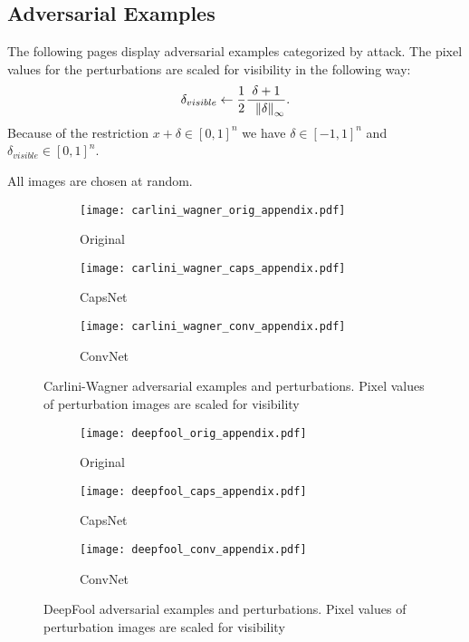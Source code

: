 \subsection{Adversarial Examples}
\label{lab:images}

The following pages display adversarial examples categorized by attack.
The pixel values for the perturbations are scaled for visibility in the following way:
\begin{equation*}
\delta_{visible} \gets \frac{1}{2}\frac{\delta + 1}{\hspace{0.6em} \norm[\infty]{\delta}} .
\end{equation*}
Because of the restriction $x + \delta \in [0,1]^n$ we have $\delta \in [-1,1]^n$ and $\delta_{visible} \in [0,1]^n$.

All images are chosen at random.

\begin{figure}
	\centering
	
	\begin{subfigure}{.23\textwidth}
		\centering
		\texttt{[image: carlini\_wagner\_orig\_appendix.pdf]}%
		\caption{Original}%
	\end{subfigure}%
	\begin{subfigure}{.36\textwidth}
		\centering
		\texttt{[image: carlini\_wagner\_caps\_appendix.pdf]}%
		\caption{CapsNet}
	\end{subfigure}%
	\begin{subfigure}{.36\textwidth}
		\centering
		\texttt{[image: carlini\_wagner\_conv\_appendix.pdf]}%
		\caption{ConvNet}
	\end{subfigure}
	\caption[Carlini-Wagner Adversarial Examples]{Carlini-Wagner adversarial examples and perturbations. Pixel values of perturbation images are scaled for visibility}
	\label{fig:carlini-wagner-img}
	
\end{figure}


\begin{figure}
	\centering
	
	\begin{subfigure}{.23\textwidth}
		\centering
		\texttt{[image: deepfool\_orig\_appendix.pdf]}%
		\caption{Original}%
	\end{subfigure}%
	\begin{subfigure}{.36\textwidth}
		\centering
		\texttt{[image: deepfool\_caps\_appendix.pdf]}%
		\caption{CapsNet}
	\end{subfigure}%
	\begin{subfigure}{.36\textwidth}
		\centering
		\texttt{[image: deepfool\_conv\_appendix.pdf]}%
		\caption{ConvNet}
	\end{subfigure}
	\caption[DeepFool Adversarial Examples]{DeepFool adversarial examples and perturbations. Pixel values of perturbation images are scaled for visibility}
	\label{fig:deepfool-img}
	
\end{figure}

